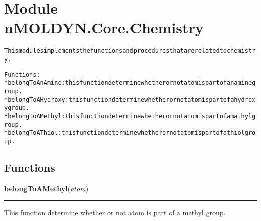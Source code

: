 %
%
%


\section{Module nMOLDYN.Core.Chemistry}

    \label{nMOLDYN:Core:Chemistry}
\begin{alltt}
This modules implements the functions and procedures that are related to chemistry.

Functions:
    * belongToAnAmine  : this function determine whether or not {\textbar}atom{\textbar} is part of an amine group.
    * belongToAHydroxy : this function determine whether or not {\textbar}atom{\textbar} is part of a hydroxy group.
    * belongToAMethyl  : this function determine whether or not {\textbar}atom{\textbar} is part of a mathyl group.
    * belongToAThiol   : this function determine whether or not {\textbar}atom{\textbar} is part of a thiol group.
\end{alltt}



  \subsection{Functions}

    \label{nMOLDYN:Core:Chemistry:belongToAMethyl}

    \vspace{0.5ex}

\hspace{.8\funcindent}\begin{boxedminipage}{\funcwidth}

    \raggedright \textbf{belongToAMethyl}(\textit{atom})

    \vspace{-1.5ex}

    \rule{\textwidth}{0.5\fboxrule}
\setlength{\parskip}{2ex}
    This function determine whether or not {\textbar}atom{\textbar} is part
    of a methyl group.

\setlength{\parskip}{1ex}
    \end{boxedminipage}

